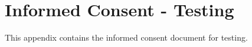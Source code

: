 %
%
%                 

\chapter{Informed Consent - Testing}
\label{sec:appendixi}

This appendix contains the informed consent document for testing. 



